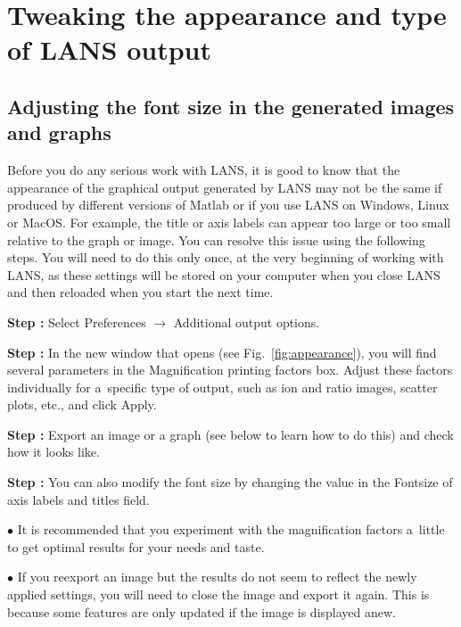 \documentclass[a4paper, 11pt]{article}
\newcommand{\lans}[1]{{\color{magenta}#1}}
\newcommand{\lanstf}[1]{{\color{cyan}#1}}
\newcommand\ra{\rightarrow}
\newcounter{step}
\newcommand\s{\addtocounter{step}{1}\vskip5pt\noindent\textbf{Step \thestep:}{ }}
\newcommand\bul{\vskip5pt\noindent$\bullet${ }}
\begin{document}

\section{Tweaking the appearance and type of LANS output}
\label{sec:appearance}

\subsection{Adjusting the font size in the generated images and graphs}
\setcounter{step}{0}

Before you do any serious work with LANS, it is good to know that the appearance of the graphical output generated by LANS may not be the same if produced by different versions of Matlab or if you use LANS on Windows, Linux or MacOS. For example, the title or axis labels can appear too large or too small relative to the graph or image. You can resolve this issue using the following steps. You will need to do this only once, at the very beginning of working with LANS, as these settings will be stored on your computer when you close LANS and then reloaded when you start the next time. 

\s Select \lans{Preferences} $\ra$ \lans{Additional output options}.

\s In the new window that opens (see Fig.~\ref{fig:appearance}), you will find several parameters in the  \lanstf{Magnification printing factors} box. Adjust these factors individually for a~specific type of output, such as ion and ratio images, scatter plots, etc., and click \lans{Apply}.

\s Export an image or a graph (see below to learn how to do this) and check how it looks like.

\s You can also modify the font size by changing the value in the \lanstf{Fontsize of axis labels and titles} field.

\bul It is recommended that you experiment with the magnification factors a~little to get optimal results for your needs and taste. 

\bul If you reexport an image but the results do not seem to reflect the newly applied settings, you will need to close the image and export it again. This is because some features are only updated if the image is displayed anew.
\end{document}
